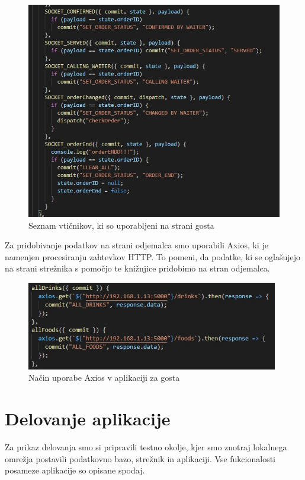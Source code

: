 \documentclass[a4paper, 12pt]{book}
\begin{document}
\begin{figure}[!htb]
\begin{center}
\includegraphics[width=12cm]{socketio_1.jpg}
\caption{Seznam vtičnikov, ki so uporabljeni na strani gosta}
\end{center}
\label{SocketIO_1}
\end{figure}


Za pridobivanje podatkov na strani odjemalca smo uporabili Axios, ki je namenjen procesiranju zahtevkov  HTTP. To pomeni, da podatke, ki se oglašujejo na strani strežnika s pomočjo te knižnjice pridobimo na stran odjemalca. 

\begin{figure}[!htb]
\begin{center}
\includegraphics[width=11cm]{axios_1.jpg}
\caption{Način uporabe Axios v aplikaciji za gosta}
\end{center}
\label{axios_1}
\end{figure}


\chapter {Delovanje aplikacije}
Za prikaz delovanja smo si pripravili testno okolje, kjer smo znotraj lokalnega omrežja postavili podatkovno bazo, strežnik in aplikaciji. Vse fukcionalosti posameze aplikacije so opisane spodaj.
\end{document}

